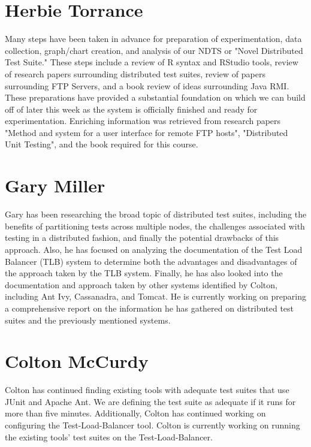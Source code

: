 \documentclass[11pt]{article}
\begin{document}
\section{Herbie Torrance}
Many steps have been taken in advance for preparation of experimentation, data collection,  graph/chart creation, and analysis of our NDTS or "Novel Distributed Test Suite." These steps include a review of R syntax and RStudio tools, review of research papers surrounding distributed test suites, review of papers surrounding FTP Servers, and a book review of ideas surrounding Java RMI.  These preparations have provided a substantial foundation on which we can build off of later this week as the system is officially finished and ready for experimentation. Enriching information was retrieved from research papers "Method and system for a user interface for remote FTP hosts", "Distributed Unit Testing", and the book required for this course.

\section{Gary Miller}
Gary has been researching the broad topic of distributed test suites, including the benefits of partitioning tests across multiple nodes, the challenges associated with testing in a distributed fashion, and finally the potential drawbacks of this approach. Also, he has focused on analyzing the documentation of the Test Load Balancer (TLB) system to determine both the advantages and disadvantages of the approach taken by the TLB system. Finally, he has also looked into the documentation and approach taken by other systems identified by Colton, including Ant Ivy, Cassanadra, and Tomcat. He is currently working on preparing a comprehensive report on the information he has gathered on distributed test suites and the previously mentioned systems.

\section{Colton McCurdy}
Colton has continued finding existing tools with adequate test suites that use JUnit and Apache Ant. We are defining the test suite as adequate if it runs for more than five minutes. Additionally, Colton has continued working on configuring the Test-Load-Balancer tool. Colton is currently working on running the existing tools' test suites on the Test-Load-Balancer.
\end{document}
